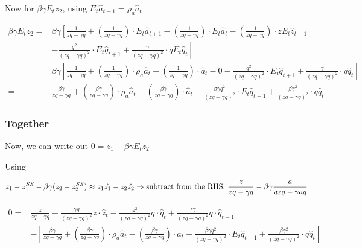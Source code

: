 \documentclass[11pt,preprint, authoryear]{elsarticle}
\numberwithin{equation}{section}
\numberwithin{figure}{section}
\numberwithin{table}{section}
\begin{document}
\newpage

Now for \(\beta \gamma E_t z_2\), using
\(E_t \hat{a}_{t+1}=\rho_a\hat{a}_t\)

\[\begin{aligned}
\beta \gamma E_t z_2
=& \beta \gamma \left[ \frac{1}{z q-\gamma q}
+ \left(\frac{1}{z q-\gamma q}\right) \cdot E_t\hat{a}_{t+1}
-\left(\frac{1}{z q-\gamma q}\right) \cdot E_t\hat{a}_{t}
-\left(\frac{1}{z q-\gamma q}\right) \cdot zE_t\hat{z}_{t+1} \right.\\
& \left. -\frac{q^2}{(zq-\gamma q)^2} \cdot E_t\hat{q}_{t+1}
+\frac{\gamma}{(z q-\gamma q)^{2}} \cdot q E_t\hat{q}_{t} \right]\\
=& \beta \gamma \left[ \frac{1}{z q-\gamma q}
+ \left(\frac{1}{z q-\gamma q}\right) \cdot \rho_a\hat{a}_t
-\left(\frac{1}{z q-\gamma q}\right) \cdot \hat{a}_{t}
-0
-\frac{q^2}{(zq-\gamma q)^2} \cdot E_t\hat{q}_{t+1}
+\frac{\gamma}{(z q-\gamma q)^{2}} \cdot q \hat{q}_{t} \right]\\
=& \frac{\beta \gamma}{z q-\gamma q}
+ \left(\frac{\beta \gamma}{z q-\gamma q}\right) \cdot \rho_a\hat{a}_t
-\left(\frac{\beta \gamma}{z q-\gamma q}\right) \cdot \hat{a}_{t}
-\frac{\beta \gamma q^2}{(z q-\gamma q)^2} \cdot E_t\hat{q}_{t+1}
+\frac{\beta \gamma^2}{(z q-\gamma q)^{2}} \cdot q \hat{q}_{t}
\end{aligned}\]

\hypertarget{together}{%
\subsubsection{Together}\label{together}}

Now, we can write out \(0 = z_1 - \beta \gamma E_t z_2\)

Using

\[z_1-z_1^{SS} - \beta \gamma (z_2 - z_2^{SS}) \approx z_1 \hat{z_1} - z_2 \hat{z_2}\\
\Rightarrow \text{subtract from the RHS: } \frac{z}{z q-\gamma q}-\beta \gamma \frac{a}{a z q-\gamma a q}\]

\[\begin{aligned}
0 = &\frac{z}{z q-\gamma q} 
- \frac{\gamma q}{(z q-\gamma q)^2} z \cdot \hat{z}_t
- \frac{z^{2}}{(z q-\gamma q)^2} q \cdot \hat{q}_t
+ \frac{z \gamma}{(z q-\gamma q)^2} q \cdot \hat{q}_{t-1}\\
&-\left[
\frac{\beta \gamma}{z q-\gamma q}
+ \left(\frac{\beta \gamma}{z q-\gamma q}\right) \cdot \rho_a\hat{a}_t
-\left(\frac{\beta \gamma}{z q-\gamma q}\right) \cdot \hat{a}_{t}
-\frac{\beta \gamma q^2}{(z q-\gamma q)^2} \cdot E_t\hat{q}_{t+1}
+\frac{\beta \gamma^2}{(z q-\gamma q)^{2}} \cdot q \hat{q}_{t} \right]
\end{aligned}\]
\end{document}
